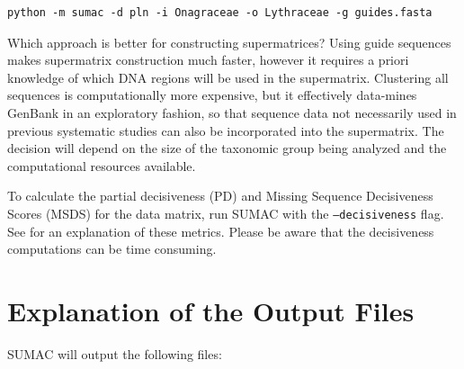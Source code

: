 \documentclass[10pt]{report}
\begin{document}
\begin{verbatim}
python -m sumac -d pln -i Onagraceae -o Lythraceae -g guides.fasta
\end{verbatim}

Which approach is better for constructing supermatrices?
Using guide sequences makes supermatrix construction much faster, however
it requires a priori knowledge of which DNA regions will be used
in the supermatrix.
Clustering all sequences is computationally
more expensive, but it effectively data-mines GenBank in an exploratory
fashion, so that sequence data not necessarily used in previous systematic
studies can also be incorporated into the supermatrix.
The decision will depend on the size of the taxonomic group being
analyzed and the computational resources available.

To calculate the partial decisiveness (PD) and Missing Sequence Decisiveness Scores (MSDS)
for the data matrix, run SUMAC with the \texttt{--decisiveness} flag.
See \citet{sumac} for an explanation of these metrics.
Please be aware that the decisiveness computations can be time consuming.

\section{Explanation of the Output Files}

SUMAC will output the following files:
\end{document}

